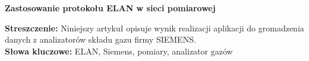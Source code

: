 \begin{center}
\textbf{Zastosowanie protokołu ELAN w sieci pomiarowej}
\end{center}
\textbf{Streszczenie: }
Niniejszy artykuł opisuje wynik realizacji aplikacji do gromadzenia danych z analizatorów składu gazu firmy SIEMENS. \\
\textbf{Słowa kluczowe: } ELAN, Siemens, pomiary, analizator gazów